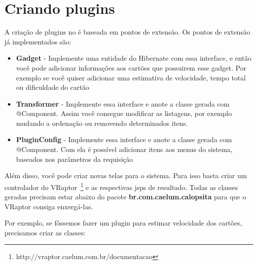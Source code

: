 \section{Criando plugins}

A criação de plugins no \calopsita{} é baseada em pontos de extensão. Os pontos de extensão já implementados são:

\begin{itemize}
	\item{\textbf{Gadget} - Implemente uma entidade do Hibernate com essa interface, e então você pode adicionar informações aos cartões que possuirem esse gadget. Por exemplo se você quiser adicionar uma estimativa de velocidade, tempo total ou dificuldade do cartão}
	\item{\textbf{Transformer} - Implemente essa interface e anote a classe gerada com @Component. Assim você consegue modificar as listagens, por exemplo mudando a ordenação ou removendo determinados itens.}
	\item{\textbf{PluginConfig} - Implemente essa interface e anote a classe gerada com @Component. Com ela é possível adicionar itens aos menus do sistema, baseados nos parâmetros da requisição}
\end{itemize}

Além disso, você pode criar novas telas para o sistema. Para isso basta criar um controlador do 
VRaptor~\footnote{http://vraptor.caelum.com.br/documentacao} e as respectivas jsps de resultado.
Todas as classes geradas precisam estar abaixo do pacote \textbf{br.com.caelum.calopsita} para que o VRaptor consiga enxergá-las.

Por exemplo, se fôssemos fazer um plugin para estimar velocidade dos cartões, precisamos criar as classes:

